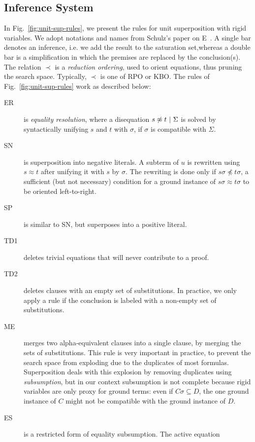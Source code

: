 \subsection{Inference System}

In Fig.~\ref{fig:unit-sup-rules}, we present the rules for unit superposition
with rigid variables. We adopt notations and names from Schulz's paper on
E~\cite{SS02}. A single bar denotes an inference, i.e. we add the result to the
saturation set,whereas a double bar is a simplification in which the premises
are replaced by the conclusion(s). The relation $\prec$ is a {\em reduction
ordering}, used to orient equations, thus pruning the search space. Typically,
$\prec$ is one of RPO or KBO. The rules of Fig.~\ref{fig:unit-sup-rules} work as
described below:

\begin{description}
\item[ER] is {\em equality resolution}, where a disequation
$s \not\approx t ~|~ \Sigma$ is solved by syntactically unifying
$s$ and $t$ with $\sigma$, if $\sigma$ is compatible with $\Sigma$.
\item[SN] is superposition into negative literals. A subterm of $u$ is rewritten
using $s \approx t$ after unifying it with $s$ by $\sigma$. The rewriting is
done only if $s\sigma \not\preceq t\sigma$, a sufficient (but not necessary)
condition for a ground instance of $s\sigma \approx t\sigma$ to be oriented
left-to-right.
\item[SP] is similar to SN, but superposes into a positive literal.
\item[TD1] deletes trivial equations that will never contribute to a proof.
\item[TD2] deletes clauses with an empty set of substitutions. In practice, we
only apply a rule if the conclusion is labeled with a non-empty set of
substitutions.
\item[ME] merges two alpha-equivalent clauses into a single clause, by merging
the sets of substitutions. This rule is very important in practice, to prevent
the search space from exploding due to the duplicates of most formulas.
Superposition deals with this explosion by removing duplicates using
{\em subsumption}, but in our context subsumption is not complete because rigid
variables are only proxy for ground terms: even if $C\sigma \subseteq D$, the
one ground instance of $C$ might not be compatible with the ground instance of
$D$.
\item[ES] is a restricted form of equality subsumption. The active equation

\end{description}

